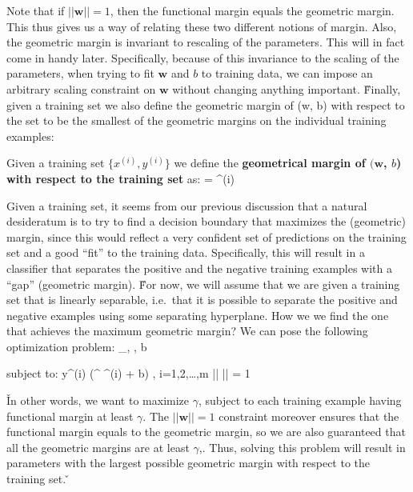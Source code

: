 Note that if $||\boldsymbol{w}|| = 1$, then the functional margin equals the geometric margin. This thus gives us a
way of relating these two different notions of margin. Also, the geometric margin is invariant to rescaling of the
parameters. This will in fact come in handy later. Specifically, because of this invariance to the scaling of the
parameters, when trying to fit $\boldsymbol{w}$ and $b$ to training data, we can impose an arbitrary scaling
constraint on $\boldsymbol{w}$ without changing anything important. \v

Finally, given a training set we also define the geometric margin of (w, b) with respect to the set to be the
smallest of the geometric margins on the individual training examples:

 Given a training set $\{ x^{(i)}, y^{(i)} \}$ we define the \textbf{geometrical
margin of $(\boldsymbol{w}$, $b$) with respect to the training set} as:
\bse
\gamma = \min {\gamma}^{(i)}
\ese
\ed

Given a training set, it seems from our previous discussion that a natural desideratum is to try to find a decision
boundary that maximizes the (geometric) margin, since this would reflect a very confident set of predictions on the
training set and a good ``fit'' to the training data. Specifically, this will result in a classifier that separates
the positive and the negative training examples with a ``gap'' (geometric margin). \v

For now, we will assume that we are given a training set that is linearly separable, i.e.\ that it is possible to
separate the positive and negative examples using some separating hyperplane. How we we find the one that achieves
the maximum geometric margin? We can pose the following optimization problem:
\bse
\max_{\gamma, , b} \gamma
\ese

subject to:
\bse
y^{(i)} (^{\intercal} ^{(i)} + b) \geq \gamma, \:\:\: i=1,2,\ldots,m
\qquad {} \qquad ||  || = 1
\ese

\v

In other words, we want to maximize $\gamma$, subject to each training example having functional margin at least
$\gamma$. The $|| \boldsymbol{w} || = 1$ constraint moreover ensures that the functional margin equals to the
geometric margin, so we are also guaranteed that all the geometric margins are at least $\gamma$,. Thus, solving this
problem will result in parameters with the largest possible geometric margin with respect to the training set. \v

